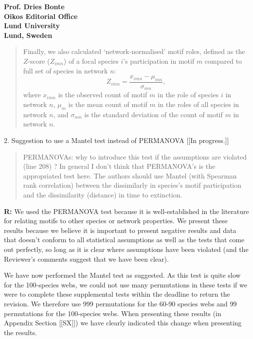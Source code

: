 \documentclass[12pt]{letter}
\begin{document}
\begin{letter}{\bf Prof. Dries Bonte\\
Oikos Editorial Office \\
Lund University \\
Lund, Sweden}
      \begin{quotation}
        Finally, we also calculated `network-normalised' motif roles, defined as the $Z$-score ($Z_{imn}$) of a focal species $i$'s participation in motif $m$ compared to full set of species in network $n$:
        \begin{equation}
                Z_{imn} = \frac{x_{imn}-\mu_{mn}}{\sigma_{mn}} ,
        \end{equation}
        where $x_{imn}$ is the observed count of motif $m$ in the role of species $i$ in network $n$, $\mu_m$ is the mean count of motif $m$ in the roles of all species in network $n$, and $\sigma_{mn}$ is the standard deviation of the count of motif $m$ in network $n$.
      \end{quotation}

    \smallskip

    2. Suggestion to use a Mantel test instead of PERMANOVA [[In progress.]]

      \begin{quotation}
        PERMANOVAs: why to introduce this test if the assumptions are violated (line 208) ? In general I don’t think that PERMANOVA’s is the appropriated test here. The authors should use Mantel (with Spearman rank correlation) between the dissimilarly in species’s motif participation and the dissimilarity (distance) in time to extinction.
      \end{quotation}

      \smallskip

      \textbf{R:} We used the PERMANOVA test because it is well-established in the literature for relating motifs to other species or network properties. We present these results because we believe it is important to present negative results and data that doesn't conform to all statistical assumptions as well as the tests that come out perfectly, so long as it is clear where assumptions have been violated (and the Reviewer's comments suggest that we have been clear). 

      We have now performed the Mantel test as suggested. As this test is quite slow for the 100-species webs, we could not use many permutations in these tests if we were to complete these supplemental tests within the deadline to return the revision. We therefore use 999 permutations for the 60-90 species webs and 99 permutations for the 100-species webs. When presenting these results (in Appendix Section [[SX]]) we have clearly indicated this change when presenting the results.



\end{letter}
\end{document}
